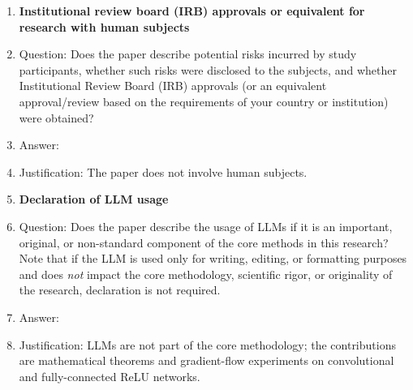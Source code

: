 \begin{enumerate}
\item {\bf Institutional review board (IRB) approvals or equivalent for research with human subjects}
    \item[] Question: Does the paper describe potential risks incurred by study participants, whether such risks were disclosed to the subjects, and whether Institutional Review Board (IRB) approvals (or an equivalent approval/review based on the requirements of your country or institution) were obtained?
    \item[] Answer: \answerNA{}
    \item[] Justification: The paper does not involve human subjects.

\item {\bf Declaration of LLM usage}
    \item[] Question: Does the paper describe the usage of LLMs if it is an important, original, or non-standard component of the core methods in this research? Note that if the LLM is used only for writing, editing, or formatting purposes and does \emph{not} impact the core methodology, scientific rigor, or originality of the research, declaration is not required.
    \item[] Answer: \answerNA{}
    \item[] Justification: LLMs are not part of the core methodology; the contributions are mathematical theorems and gradient-flow experiments on convolutional and fully-connected ReLU networks.

\end{enumerate}
